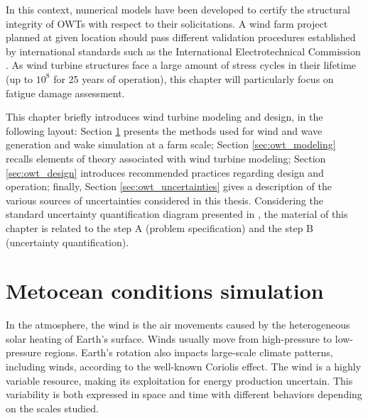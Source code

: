 In this context, numerical models have been developed to certify the structural integrity of OWTs with respect to their solicitations. 
A wind farm project planned at given location should pass different validation procedures established by international standards such as the International Electrotechnical Commission \citep{iec_2019}. 
As wind turbine structures face a large amount of stress cycles in their lifetime (up to $10^8$ for 25 years of operation), this chapter will particularly focus on fatigue damage assessment.


This chapter briefly introduces wind turbine modeling and design, in the following layout: 
Section \ref{sec:metocean_simulation} presents the methods used for wind and wave generation and wake simulation at a farm scale; 
Section \ref{sec:owt_modeling} recalls elements of theory associated with wind turbine modeling; 
Section \ref{sec:owt_design} introduces recommended practices regarding design and operation;
finally, Section \ref{sec:owt_uncertainties} gives a description of the various sources of uncertainties considered in this thesis. 
Considering the standard uncertainty quantification diagram presented in , the material of this chapter is related to the step A (problem specification) and the step B (uncertainty quantification). 



\section{Metocean conditions simulation} \label{sec:metocean_simulation}

In the atmosphere, the wind is the air movements caused by the heterogeneous solar heating of Earth's surface. 
Winds usually move from high-pressure to low-pressure regions. 
Earth's rotation also impacts large-scale climate patterns, including winds, according to the well-known Coriolis effect. 
The wind is a highly variable resource, making its exploitation for energy production uncertain. 
This variability is both expressed in space and time with different behaviors depending on the scales studied. 


